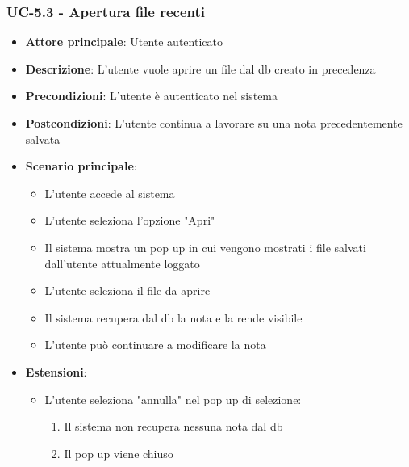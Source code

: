 \documentclass[11pt,a4paper]{article}
\begin{document}
\subsubsection{UC-5.3 - Apertura file recenti}
\begin{itemize}
    \item \textbf{Attore principale}: Utente autenticato
    \item \textbf{Descrizione}: L'utente vuole aprire un file dal db creato in precedenza
    \item \textbf{Precondizioni}: L'utente è autenticato nel sistema
    \item \textbf{Postcondizioni}: L'utente continua a lavorare su una nota precedentemente salvata
    \item \textbf{Scenario principale}:
        \begin{itemize}
            \item L'utente accede al sistema
            \item L'utente seleziona l'opzione "Apri"
            \item Il sistema mostra un pop up in cui vengono mostrati i file salvati dall'utente attualmente loggato
            \item L'utente seleziona il file da aprire
            \item Il sistema recupera dal db la nota e la rende visibile
            \item L'utente può continuare a modificare la nota
        \end{itemize}
    \item \textbf{Estensioni}:
        \begin{itemize}
            \item L'utente seleziona "annulla" nel pop up di selezione:
                \begin{enumerate}
                    \item Il sistema non recupera nessuna nota dal db
                    \item Il pop up viene chiuso
                \end{enumerate}
        \end{itemize}
\end{itemize}
\end{document}
